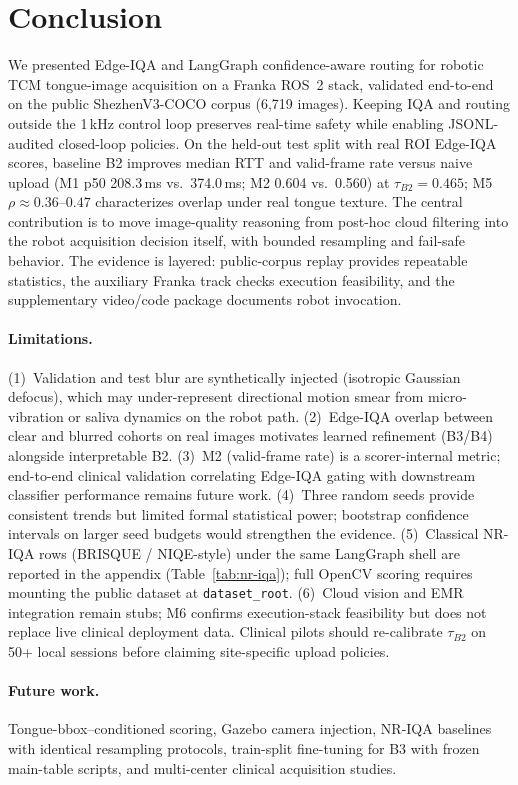 \section{Conclusion}
\label{sec:conclusion}

We presented Edge-IQA and LangGraph confidence-aware routing for robotic TCM tongue-image acquisition on a Franka ROS~2 stack, validated end-to-end on the public ShezhenV3-COCO corpus (6{,}719 images).
Keeping IQA and routing outside the 1\,kHz control loop preserves real-time safety while enabling JSONL-audited closed-loop policies.
On the held-out test split with real ROI Edge-IQA scores, baseline B2 improves median RTT and valid-frame rate versus naive upload (M1 p50 208.3\,ms vs.\ 374.0\,ms; M2 0.604 vs.\ 0.560) at $\tau_{B2}{=}0.465$; M5 $\rho{\approx}0.36$--$0.47$ characterizes overlap under real tongue texture.
The central contribution is to move image-quality reasoning from post-hoc cloud filtering into the robot acquisition decision itself, with bounded resampling and fail-safe behavior.
The evidence is layered: public-corpus replay provides repeatable statistics, the auxiliary Franka track checks execution feasibility, and the supplementary video/code package documents robot invocation.

\paragraph{Limitations.}
(1)~Validation and test blur are synthetically injected (isotropic Gaussian defocus), which may under-represent directional motion smear from micro-vibration or saliva dynamics on the robot path.
(2)~Edge-IQA overlap between clear and blurred cohorts on real images motivates learned refinement (B3/B4) alongside interpretable B2.
(3)~M2 (valid-frame rate) is a scorer-internal metric; end-to-end clinical validation correlating Edge-IQA gating with downstream classifier performance remains future work.
(4)~Three random seeds provide consistent trends but limited formal statistical power; bootstrap confidence intervals on larger seed budgets would strengthen the evidence.
(5)~Classical NR-IQA rows (BRISQUE / NIQE-style) under the same LangGraph shell are reported in the appendix (Table~\ref{tab:nr-iqa}); full OpenCV scoring requires mounting the public dataset at \texttt{dataset\_root}.
(6)~Cloud vision and EMR integration remain stubs; M6 confirms execution-stack feasibility but does not replace live clinical deployment data.
Clinical pilots should re-calibrate $\tau_{B2}$ on 50+ local sessions before claiming site-specific upload policies.

\paragraph{Future work.}
Tongue-bbox--conditioned scoring, Gazebo camera injection, NR-IQA baselines with identical resampling protocols, train-split fine-tuning for B3 with frozen main-table scripts, and multi-center clinical acquisition studies.
